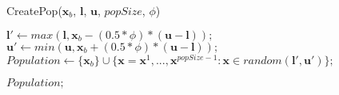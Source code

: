 \begin{algorithm*}
\caption{CreatePop($\bm{x}_b$, $\bm{l}$, $\bm{u}$, $popSize$, $\phi$)}
\label{alg:CreatePop}
\begin{algorithmic}[1]

\State $\bm{l}' \gets max(\bm{l}, \bm{x}_b - (0.5 * \phi) * (\bm{u} - \bm{l}));$
\State $\bm{u}' \gets min(\bm{u}, \bm{x}_b + (0.5 * \phi) * (\bm{u} - \bm{l}));$
\State $Population \gets \{\bm{x}_b\} \cup \{\bm{x} = \bm{x}^1, ..., \bm{x}^{popSize-1} : \bm{x} \in random(\bm{l}', \bm{u}')\};$

\State \Return $Population;$

\end{algorithmic}
\end{algorithm*}